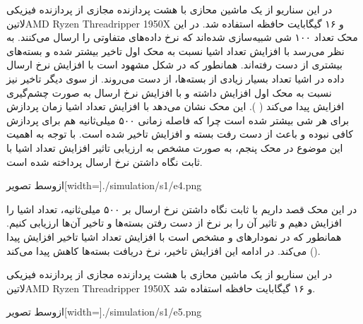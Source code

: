 در این سناریو از یک ماشین محازی با هشت پردازنده مجازی از پردازنده فیزیکی
‌لاتین{AMD Ryzen Threadripper 1950X}
و ۱۶ گیگابایت حافظه استفاده شد.
در این محک تعداد ۱۰۰ شی شبیه‌سازی شده‌اند که نرخ داده‌های متفاوتی را ارسال می‌کنند. به نظر می‌رسد با افزایش تعداد اشیا نسبت به محک‌ اول تاخیر بیشتر شده و بسته‌های بیشتری
از دست رفته‌اند. همانطور که در شکل  مشهود است با افزایش نرخ ارسال داده در اشیا
تعداد بسیار زیادی از بسته‌ها، از دست می‌روند.
از سوی دیگر تاخیر نیز نسبت به محک اول افزایش داشته و با افزایش نرخ ارسال به صورت چشم‌گیری افزایش پیدا می‌کند
( ).
این محک نشان می‌دهد با افزایش تعداد اشیا زمان پردازش برای هر شی بیشتر شده است چرا که فاصله زمانی ۵۰۰ میلی‌ثانیه هم برای پردازش کافی نبوده و باعث از دست رفت بسته و
افزایش تاخیر شده است. با توجه به اهمیت این موضوع در محک پنجم، به صورت مشخص به ارزیابی تاثیر افزایش تعداد اشیا با ثابت نگاه داشتن نرخ ارسال پرداخته شده است.

‌ازوسط
‌تصویر[width=\textwidth]{./simulation/s1/e4.png}


در این محک قصد داریم با ثابت نگاه داشتن نرخ ارسال بر ۵۰۰ میلی‌ثانیه، تعداد اشیا را افزایش دهیم و تاثیر آن را بر نرخ از دست رفتن بسته‌ها و تاخیر آن‌ها ارزیابی کنیم.
همانطور که در نمودارهای 
و  مشخص است با افزایش تعداد اشیا تاخیر افزایش پیدا می‌کند.
در ادامه این افزایش تاخیر، نرخ دریافت بسته‌ها کاهش پیدا می‌کند ().

در این سناریو از یک ماشین محازی با هشت پردازنده مجازی از پردازنده فیزیکی
‌لاتین{AMD Ryzen Threadripper 1950X}
و ۱۶ گیگابایت حافظه استفاده شد.

‌ازوسط
‌تصویر[width=\textwidth]{./simulation/s1/e5.png}

